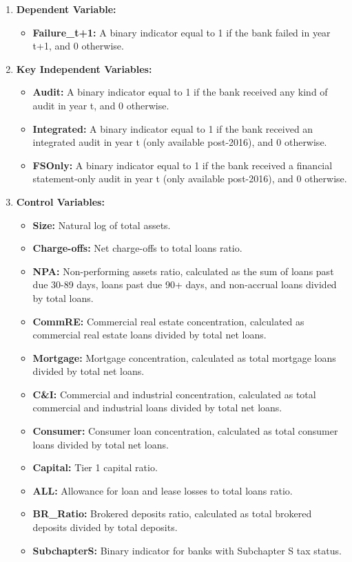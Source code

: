 \documentclass[12pt]{article}
\begin{document}
\begin{enumerate}
    \item \textbf{Dependent Variable:}
    \begin{itemize}
        \item \textbf{Failure\_t+1:} A binary indicator equal to 1 if the bank failed in year t+1, and 0 otherwise.
    \end{itemize}
    
    \item \textbf{Key Independent Variables:}
    \begin{itemize}
        \item \textbf{Audit:} A binary indicator equal to 1 if the bank received any kind of audit in year t, and 0 otherwise.
        \item \textbf{Integrated:} A binary indicator equal to 1 if the bank received an integrated audit in year t (only available post-2016), and 0 otherwise.
        \item \textbf{FSOnly:} A binary indicator equal to 1 if the bank received a financial statement-only audit in year t (only available post-2016), and 0 otherwise.
    \end{itemize}
    
    \item \textbf{Control Variables:}
    \begin{itemize}
        \item \textbf{Size:} Natural log of total assets.
        \item \textbf{Charge-offs:} Net charge-offs to total loans ratio.
        \item \textbf{NPA:} Non-performing assets ratio, calculated as the sum of loans past due 30-89 days, loans past due 90+ days, and non-accrual loans divided by total loans.
        \item \textbf{CommRE:} Commercial real estate concentration, calculated as commercial real estate loans divided by total net loans.
        \item \textbf{Mortgage:} Mortgage concentration, calculated as total mortgage loans divided by total net loans.
        \item \textbf{C\&I:} Commercial and industrial concentration, calculated as total commercial and industrial loans divided by total net loans.
        \item \textbf{Consumer:} Consumer loan concentration, calculated as total consumer loans divided by total net loans.
        \item \textbf{Capital:} Tier 1 capital ratio.
        \item \textbf{ALL:} Allowance for loan and lease losses to total loans ratio.
        \item \textbf{BR\_Ratio:} Brokered deposits ratio, calculated as total brokered deposits divided by total deposits.
        \item \textbf{SubchapterS:} Binary indicator for banks with Subchapter S tax status.
    \end{itemize}
\end{enumerate}
\end{document}
